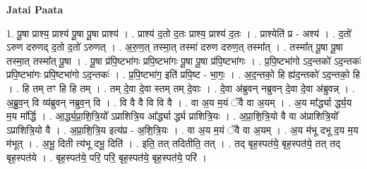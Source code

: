 \documentclass[17pt]{extarticle}
\begin{document}
\textbf{Jatai Paata} \newline

1. पू॒षा प्राश्य॒ प्राश्य॑ पू॒षा पू॒षा प्राश्य॑ । . प्राश्य॑ द॒तो द॒तः प्राश्य॒ प्राश्य॑ द॒तः । . प्राश्येति॑ प्र - अश्य॑ । . द॒तो॑ ऽरुण दरुणद् द॒तो द॒तो॑ ऽरुणत् । . अ॒रु॒ण॒त् तस्मा॒त् तस्मा॑ दरुण दरुण॒त् तस्मा᳚त् । . तस्मा᳚त् पू॒षा पू॒षा तस्मा॒त् तस्मा᳚त् पू॒षा । . पू॒षा प्र॑पि॒ष्टभा॑गः प्रपि॒ष्टभा॑गः पू॒षा पू॒षा प्र॑पि॒ष्टभा॑गः । . प्र॒पि॒ष्टभा॑गो ऽद॒न्तको॑ ऽद॒न्तकः॑ प्रपि॒ष्टभा॑गः प्रपि॒ष्टभा॑गो ऽद॒न्तकः॑ । . प्र॒पि॒ष्टभा॑ग॒ इति॑ प्रपि॒ष्ट - भा॒गः॒ । . अ॒द॒न्तको॒ हि ह्य॑द॒न्तको॑ ऽद॒न्तको॒ हि । . हि तम् तꣳ हि हि तम् । . तम् दे॒वा दे॒वा स्तम् तम् दे॒वाः । . दे॒वा अ॑ब्रुवन् नब्रुवन् दे॒वा दे॒वा अ॑ब्रुवन्न् । . अ॒ब्रु॒व॒न् वि व्य॑ब्रुवन् नब्रुव॒न् वि । . वि वै वै वि वि वै । . वा अ॒य म॒यं ॅवै वा अ॒यम् । . अ॒य मा᳚र्द्ध्या र्द्ध्य॒य म॒य मा᳚र्द्धि । . आ॒र्द्ध्य॒प्रा॒शि॒त्रि॒यो᳚ ऽप्राशित्रि॒य आ᳚र्द्ध्या र्द्ध्य प्राशित्रि॒यः । . अ॒प्रा॒शि॒त्रि॒यो वै वा अ॑प्राशित्रि॒यो᳚ ऽप्राशित्रि॒यो वै । . अ॒प्रा॒शि॒त्रि॒य इत्य॑प्र - अ॒शि॒त्रि॒यः । . वा अ॒य म॒यं ॅवै वा अ॒यम् । . अ॒य म॑भू दभू द॒य म॒य म॑भूत् । . अ॒भू॒ दिती त्य॑भू दभू॒ दिति॑ । . इति॒ तत् तदितीति॒ तत् । . तद् बृह॒स्पत॑ये॒ बृह॒स्पत॑ये॒ तत् तद् बृह॒स्पत॑ये । . बृह॒स्पत॑ये॒ परि॒ परि॒ बृह॒स्पत॑ये॒ बृह॒स्पत॑ये॒ परि॑ । \newline
\end{document}
